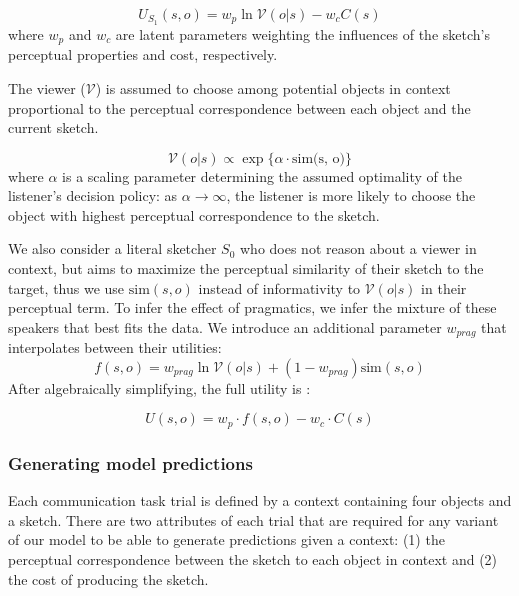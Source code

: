 \documentclass[9pt,twocolumn,twoside]{pnas-new}
\begin{document}
{\begin{equation} \label{sketcher_utility}
U_{S_1}(s, o) = w_p \ln \mathcal{V}(o|s) - w_c C(s)
\end{equation}
where $w_p$ and $w_c$ are latent parameters weighting the influences of the sketch's perceptual properties and cost, respectively.

The viewer ($\mathcal{V}$) is assumed to choose among potential objects in context proportional to the perceptual correspondence between each object and the current sketch.

\begin{equation} \label{literal_viewer_score}
\mathcal{V}(o|s) \propto \exp\{\alpha \cdot \textrm{sim(s, o)}\}
\end{equation}
where $\alpha$ is a scaling parameter determining the assumed optimality of the listener's decision policy: as $\alpha \rightarrow \infty$, the listener is more likely to choose the object with highest perceptual correspondence to the sketch.

We also consider a literal sketcher $S_0$ who does not reason about a viewer in context, but aims to maximize the perceptual similarity of their sketch to the target, thus we use $\textrm{sim}(s, o)$ instead of informativity to $\mathcal{V}(o|s)$ in their perceptual term. To infer the effect of pragmatics, we infer the mixture of these speakers that best fits the data. We introduce an additional parameter $w_{prag}$ that interpolates between their utilities: $$f(s,o) = w_{prag}\ln \mathcal{V}(o | s) + (1-w_{prag}) \textrm{sim}(s,o)$$ After algebraically simplifying, the full utility is :

\begin{equation}
U(s,o) =  w_p \cdot  f(s,o) - w_c \cdot C(s)
\end{equation}


\subsubsection*{Generating model predictions}

Each communication task trial is defined by a context containing four objects and a sketch. There are two attributes of each trial that are required for any variant of our model to be able to generate predictions given a context: (1) the perceptual correspondence between the sketch to each object in context and (2) the cost of producing the sketch.

}
\end{document}
